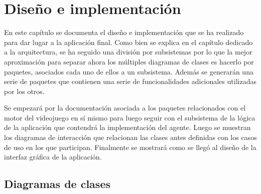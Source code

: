 \chapter{Diseño e implementación}

En este capítulo se documenta el diseño e implementación que se ha realizado para dar lugar a la aplicación final. Como bien se explica en el capítulo dedicado a la arquitectura, se ha seguido una división por subsistemas por lo que la mejor aproximación para separar ahora los múltiples diagramas de clases es hacerlo por paquetes, asociados cada uno de ellos a un subsistema. Además se generarán una serie de paquetes que contienen una serie de funcionalidades adicionales utilizadas por los otros.

\bigskip

Se empezará por la documentación asociada a los paquetes relacionados con el motor del videojuego en sí mismo para luego seguir con el subsistema de la lógica de la aplicación que contendrá la implementación del agente. Luego se muestran los diagramas de interacción que relacionan las clases antes definidas con los casos de uso en los que participan. Finalmente se mostrará como se llegó al diseño de la interfaz gráfica de la aplicación.

\section{Diagramas de clases}




